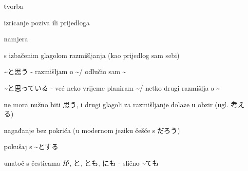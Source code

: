 
\author{Tomislav Mamić}

	
	\begin{hyou}
		\item tvorba
		\item izricanje poziva ili prijedloga
		\item namjera
		\begin{hyou}
			\item s izbačenim glagolom razmišljanja (kao prijedlog sam sebi)
			\item \textasciitilde と思う - razmišljam o \textasciitilde / odlučio sam \textasciitilde
			\item \textasciitilde と思っている - već neko vrijeme planiram \textasciitilde / netko drugi razmišlja o \textasciitilde
			\item ne mora nužno biti 思う, i drugi glagoli za razmišljanje dolaze u obzir (ugl. 考える)
		\end{hyou}
		\item nagađanje bez pokrića (u modernom jeziku češće s だろう)
		\item pokušaj s \textasciitilde とする
		\item unatoč s česticama が, と, とも, にも - slično \textasciitilde ても
	\end{hyou}
